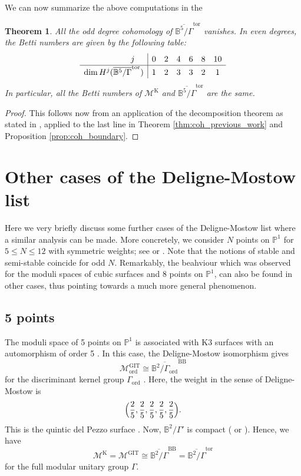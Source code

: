 \documentclass[12pt, pdftex]{amsart}
\theoremstyle{plain}
\newtheorem{thm}{Theorem}[section]
\theoremstyle{definition}
\numberwithin{equation}{section}
\def\P{{\mathbb P}}
\def\B{{\mathbb B}}
\def\dim{\mathop{\mathrm{dim}}\nolimits}
\def\ord{\mathrm{ord}}
\def\GIT{\mathrm{GIT}}
\def\K{\mathrm{K}}
\def\tor{\mathrm{tor}}
\def\BB{\mathrm{BB}}
\def\M{\mathcal{M}}
\begin{document}
We can now summarize the above computations in the 

\begin{thm}
\label{thm:coh_tor}
All the odd degree cohomology of $\overline{\B^5/\Gamma}^{\tor}$ vanishes.
In even degrees, the Betti numbers are given by the following table:
\begin{align*}
\renewcommand*{\arraystretch}{1.2}
\begin{array}{l|cccccc}
\hskip2cm j&0&2&4&6&8&10\\\hline
\dim H^j(\overline{\B^5/\Gamma}^{\tor})&1&2&3&3&2&1\\
\end{array}
\end{align*}
In particular, all the Betti numbers of $\M^{\K}$ and $\overline{\B^5/\Gamma}^{\tor}$ are the  same.
\end{thm}
\begin{proof}
This follows now from an application of the decomposition theorem as stated in \cite[Lemma 9.1]{GH17}, applied to the last line in Theorem \ref{thm:coh_previous_work} and Proposition \ref{prop:coh_boundary}.  
\end{proof}


\section{Other cases of the Deligne-Mostow list}\label{sec:othercases}
Here we very briefly discuss some further cases of the Deligne-Mostow list where a similar analysis can be made.
More concretely, we consider $N$ points on $\P^1$ for $5\leq N \leq 12$ with symmetric weights; see \cite{DM86} or \cite[Appendix]{Th98}.
Note that the notions of stable and semi-stable coincide for odd $N$.
Remarkably, the beahviour which was observed for the moduli spaces of cubic surfaces and 8 points on $\P^1$, can also be found in other cases, thus pointing towards a 
much more general phenomenon. 

\subsection{5 points}
The moduli space of 5 points on $\P^1$ is associated with K3 surfaces with an automorphism of order 5 \cite{Ko07b}.
In this case, the Deligne-Mostow isomorphism gives 
\[\M_{\ord}^{\GIT}\cong\overline{\B^2/\Gamma_{\ord}}^{\BB}\]
for the discriminant kernel group $\Gamma_{\ord}$ \cite[Subsection 6.3, (6.5)]{Ko07b}.
Here, the weight in the sense of Deligne-Mostow is
\[\Bigl(\frac{2}{5},\frac{2}{5},\frac{2}{5},\frac{2}{5},\frac{2}{5}\Bigr).\]
This is the quintic del Pezzo surface \cite[Proposition 6.2 (2)]{Ko02}.
Now, $\B^2/\Gamma'$ is compact (\cite[Subsection 6.5]{Ko07b} or \cite[Appendix]{Th98}).
Hence, we have 
\[\M^{\K}=\M^{\GIT}\cong\overline{\B^2/\Gamma}^{\BB}=\overline{\B^2/\Gamma}^{\tor}\]
for the full modular unitary group $\Gamma$.
\end{document}
